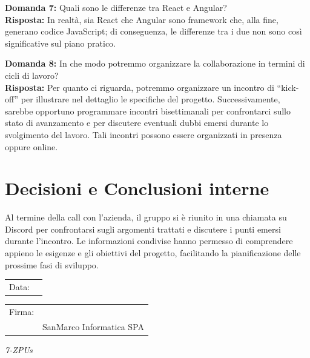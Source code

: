 \documentclass[a4paper,12pt]{article}
\begin{document}
\vspace{2em}

\textbf{Domanda 7:} Quali sono le differenze tra React e Angular?\\[0.5em]
\textbf{Risposta:} In realtà, sia React che Angular sono framework che, alla fine, generano codice JavaScript; di conseguenza, le differenze tra i due non sono così significative sul piano pratico.

\vspace{2em}

\textbf{Domanda 8:} In che modo potremmo organizzare la collaborazione in termini di cicli di lavoro?\\[0.5em]
\textbf{Risposta:} Per quanto ci riguarda, potremmo organizzare un incontro di “kick-off” per illustrare nel dettaglio le specifiche del progetto. Successivamente, sarebbe opportuno programmare incontri bisettimanali per confrontarci sullo stato di avanzamento e per discutere eventuali dubbi emersi durante lo svolgimento del lavoro. Tali incontri possono essere organizzati in presenza oppure online.


\vspace{0.5cm}
\section{Decisioni e Conclusioni interne}
Al termine della call con l’azienda, il gruppo si è riunito in una chiamata su Discord per confrontarsi sugli argomenti trattati e discutere i punti emersi durante l’incontro. Le informazioni condivise hanno permesso di comprendere appieno le esigenze e gli obiettivi del progetto, facilitando la pianificazione delle prossime fasi di sviluppo. 

\vspace{15em}

\begin{tabular}{@{}p{0.5in}p{2in}@{}}
Data: & \hrulefill \\
\end{tabular}

\vspace{1em}

\begin{tabular}{@{}p{0.5in}p{2in}@{}}
Firma: & \hrulefill \\
& SanMarco Informatica SPA \\
\end{tabular}

\vfill
\begin{flushright}
    \textit{7-ZPUs}
\end{flushright}
\end{document}
